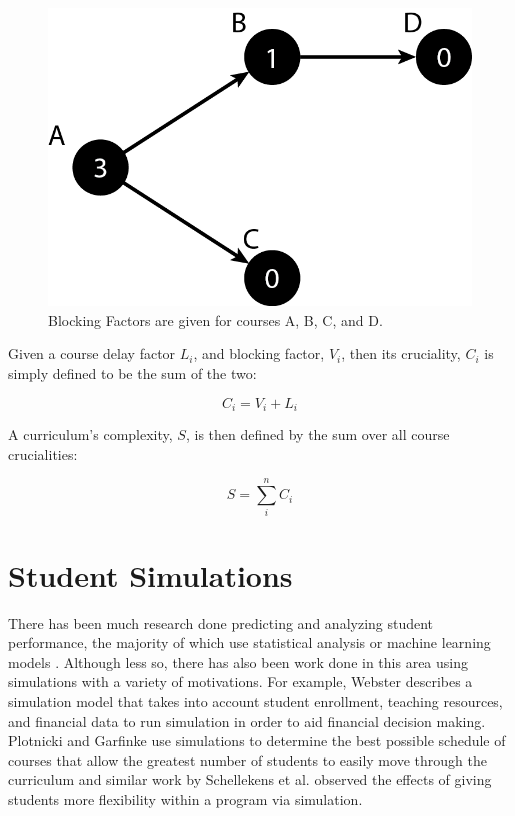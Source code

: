 \documentclass[botnum, fleqn]{unmeethesis}
\begin{document}
    \begin{figure}[h!]
      \centerline{\includegraphics[scale=0.4]{./figures/blocking_factor.png}}
      \caption{Blocking Factors are given for courses A, B, C, and D.} 
      \label{fig:blocking_factor_example}
    \end{figure}

    Given a course delay factor \(L_i\), and blocking factor, \(V_i\), then its cruciality, \(C_i\) is simply defined to be the sum of the two:

    \begin{equation}
      C_{i} = V_{i} + L_{i}
    \end{equation}

    A curriculum's complexity, \(S\), is then defined by the sum over all course crucialities:

    \begin{equation}
      S = \sum_{i}^n C_{i}
    \end{equation}


  \section{Student Simulations}
    There has been much research done predicting and analyzing student performance, the majority of which use statistical analysis or machine learning models \cite{6826206,goenner2004predicting,7008697}. Although less so, there has also been work done in this area using simulations with a variety of motivations. For example, Webster \cite{10.2307/3444955} describes a simulation model that takes into account student enrollment, teaching resources, and financial data to run simulation in order to aid financial decision making. Plotnicki and Garfinke \cite{RePEc:eee:soceps:v:20:y:1986:i:4:p:193-199} use simulations to determine the best possible schedule of courses that allow the greatest number of students to easily move through the curriculum and similar work by Schellekens et al. \cite{10.2307/40540244} observed the effects of giving students more flexibility within a program via simulation.
\end{document}
